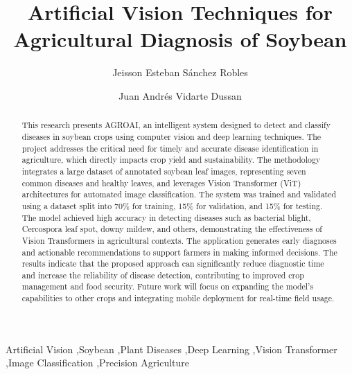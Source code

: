 \documentclass[preprint,12pt]{elsarticle}
\begin{document}
\begin{frontmatter}

\title{Artificial Vision Techniques for Agricultural Diagnosis of Soybean}

\author[aff1]{Jeisson Esteban Sánchez Robles}

\author[aff1]{Juan Andrés Vidarte Dussan}



\begin{abstract}
  This research presents AGROAI, an intelligent system designed to detect and classify diseases in soybean crops using computer vision and deep learning techniques. The project addresses the critical need for timely and accurate disease identification in agriculture, which directly impacts crop yield and sustainability. The methodology integrates a large dataset of annotated soybean leaf images, representing seven common diseases and healthy leaves, and leverages Vision Transformer (ViT) architectures for automated image classification. The system was trained and validated using a dataset split into 70\% for training, 15\% for validation, and 15\% for testing. The model achieved high accuracy in detecting diseases such as bacterial blight, Cercospora leaf spot, downy mildew, and others, demonstrating the effectiveness of Vision Transformers in agricultural contexts. The application generates early diagnoses and actionable recommendations to support farmers in making informed decisions. The results indicate that the proposed approach can significantly reduce diagnostic time and increase the reliability of disease detection, contributing to improved crop management and food security. Future work will focus on expanding the model's capabilities to other crops and integrating mobile deployment for real-time field usage.
\end{abstract}
  
\begin{keyword}
  Artificial Vision \sep Soybean \sep Plant Diseases \sep Deep Learning \sep Vision Transformer \sep Image Classification \sep Precision Agriculture
  \end{keyword}  

\end{frontmatter}
\end{document}
